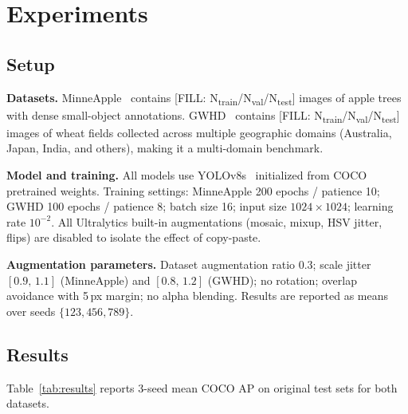 \documentclass[conference]{IEEEtran}
\begin{document}
\section{Experiments}

\subsection{Setup}

\textbf{Datasets.}
MinneApple~\cite{hani2020minneapple} contains
[FILL: N\textsubscript{train}/N\textsubscript{val}/N\textsubscript{test}]
images of apple trees with dense small-object annotations.
GWHD~\cite{david2021global} contains
[FILL: N\textsubscript{train}/N\textsubscript{val}/N\textsubscript{test}]
images of wheat fields collected across multiple geographic domains
(Australia, Japan, India, and others), making it a multi-domain
benchmark.

\textbf{Model and training.}
All models use YOLOv8s~\cite{yolov8} initialized from COCO pretrained
weights. Training settings: MinneApple 200 epochs / patience 10;
GWHD 100 epochs / patience 8; batch size 16; input size
$1024{\times}1024$; learning rate $10^{-2}$. All Ultralytics
built-in augmentations (mosaic, mixup, HSV jitter, flips) are
disabled to isolate the effect of copy-paste.

\textbf{Augmentation parameters.}
Dataset augmentation ratio 0.3; scale jitter $[0.9,\,1.1]$
(MinneApple) and $[0.8,\,1.2]$ (GWHD); no rotation; overlap
avoidance with 5\,px margin; no alpha blending.
Results are reported as means over seeds $\{123,456,789\}$.

\subsection{Results}

Table~\ref{tab:results} reports 3-seed mean COCO AP on original test
sets for both datasets.
\end{document}
